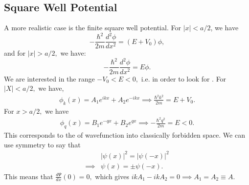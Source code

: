 \documentclass{article}
\numberwithin{equation}{section}
\begin{document}
\subsection{Square Well Potential}
A more realistic case is the finite square well potential. For $|x| < a/2$, we have 
\begin{equation*}
    -\frac{\hbar^2}{2m}\frac{d^2\phi}{dx^2} = (E+V_0)\phi,
\end{equation*}
and for $|x| > a/2,$ we have:
\begin{equation*}
    -\frac{\hbar^2}{2m}\frac{d^2\phi}{dx^2} = E\phi.
\end{equation*}
We are interested in the range $-V_0 < E < 0,$ i.e. in order to look for . For $|X|<a/2,$ we have,
\begin{align*}
    \phi_k(x) = A_1e^{ikx}+A_2e^{-ikx} \implies \frac{\hbar^2 k^2}{2m} = E + V_0.
\end{align*}
For $x>a/2,$ we have 
\begin{align*}
    \phi_q(x) = B_1e^{-qx} + B_2e^{qx} \implies -\frac{\hbar^2q^2}{2m} = E < 0.
\end{align*}
This corresponds to the  of wavefunction into classically forbidden space. We can use symmetry to say that 
\begin{align*}
    & |\psi(x)|^2 = |\psi(-x)|^2 \\ 
    \implies & \psi(x) = \pm \psi(-x).
\end{align*}
This means that $\frac{d\Psi}{dx}(0) = 0,$ which gives $ikA_1-ikA_2=0\implies A_1=A_2\equiv A.$
\end{document}
